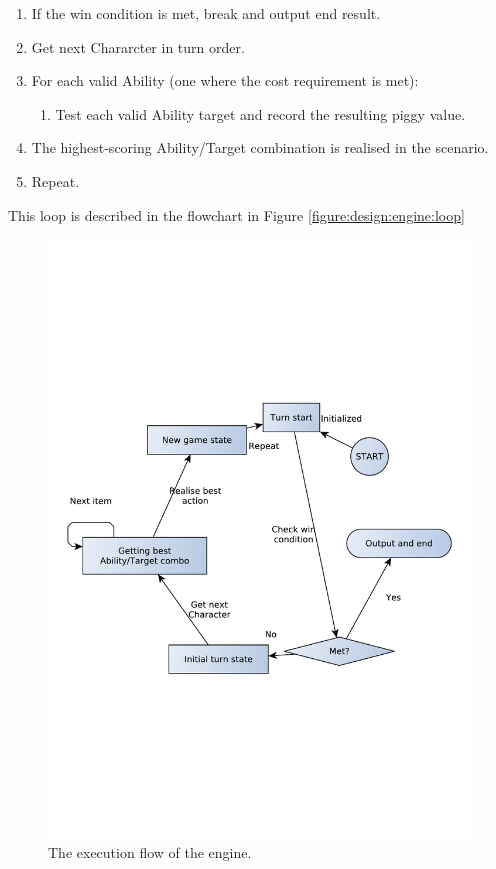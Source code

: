 \begin{enumerate}
	\item If the win condition is met, break and output end result.
	\item Get next Chararcter in turn order.
	\item For each valid Ability (one where the cost requirement is met):
	\begin{enumerate}
		\item Test each valid Ability target and record the resulting piggy value.
	\end{enumerate}
	\item The highest-scoring Ability/Target combination is realised in the scenario.
	\item Repeat.
\end{enumerate}

This loop is described in the flowchart in Figure \vref{figure:design:engine:loop}

\begin{figure}[h]
\centering
\includegraphics[scale=0.5, clip=true, trim=1cm 8cm 1cm 8cm]{img/engine_exec_loop}
\caption{\label{figure:design:engine:loop}The execution flow of the engine.}
\end{figure}

